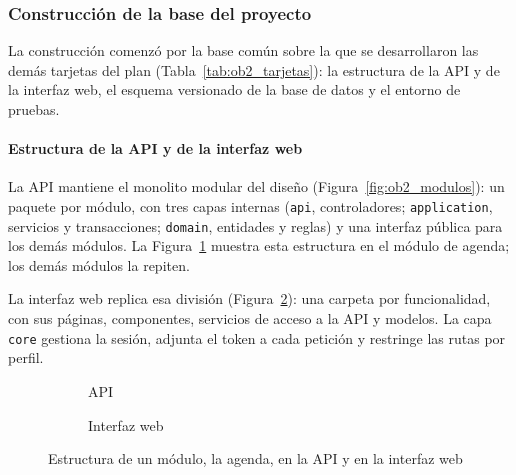 
\subsubsection{Construcción de la base del proyecto}

La construcción comenzó por la base común sobre la que se desarrollaron las demás tarjetas del plan (Tabla~\ref{tab:ob2_tarjetas}): la estructura de la API y de la interfaz web, el esquema versionado de la base de datos y el entorno de pruebas.

\paragraph{Estructura de la API y de la interfaz web}

La API mantiene el monolito modular del diseño (Figura~\ref{fig:ob2_modulos}): un paquete por módulo, con tres capas internas (\texttt{api}, controladores; \texttt{application}, servicios y transacciones; \texttt{domain}, entidades y reglas) y una interfaz pública para los demás módulos. La Figura~\ref{fig:ob3_arbol_api} muestra esta estructura en el módulo de agenda; los demás módulos la repiten.

La interfaz web replica esa división (Figura~\ref{fig:ob3_arbol_web}): una carpeta por funcionalidad, con sus páginas, componentes, servicios de acceso a la API y modelos. La capa \texttt{core} gestiona la sesión, adjunta el token a cada petición y restringe las rutas por perfil.

\begin{figure}[H]
\centering
\begin{subfigure}[t]{0.48\linewidth}
\footnotesize
{}
\caption{API}
\label{fig:ob3_arbol_api}
\end{subfigure}\hfill
\begin{subfigure}[t]{0.48\linewidth}
\footnotesize
{}
\caption{Interfaz web}
\label{fig:ob3_arbol_web}
\end{subfigure}
\caption{Estructura de un módulo, la agenda, en la API y en la interfaz web}
\label{fig:ob3_arboles}
\end{figure}

